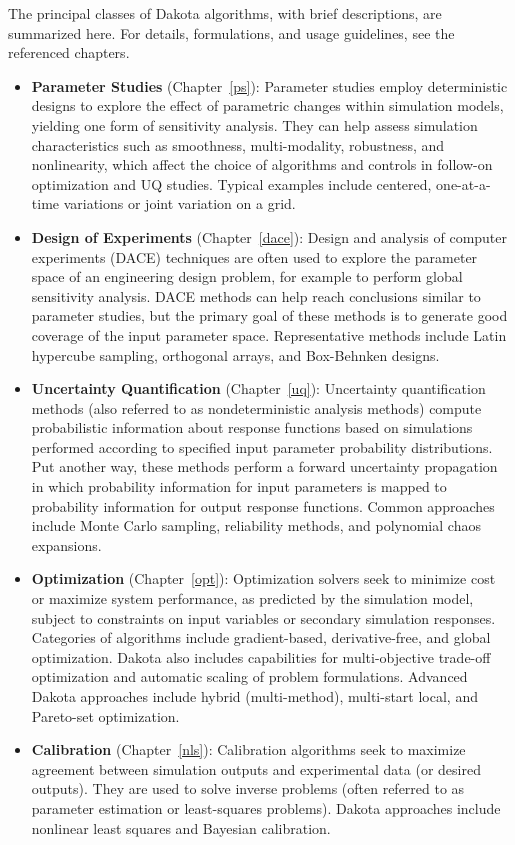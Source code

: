 The principal classes of Dakota algorithms, with brief descriptions,
are summarized here. For details, formulations, and usage guidelines,
see the referenced chapters.
\begin{itemize}
\item {\bf Parameter Studies} (Chapter~\ref{ps}): Parameter studies
  employ deterministic designs to explore the effect of parametric
  changes within simulation models, yielding one form of sensitivity
  analysis. They can help assess simulation characteristics such as
  smoothness, multi-modality, robustness, and nonlinearity, which
  affect the choice of algorithms and controls in follow-on
  optimization and UQ studies. Typical examples include centered,
  one-at-a-time variations or joint variation on a grid.

\item {\bf Design of Experiments} (Chapter~\ref{dace}): Design and
  analysis of computer experiments (DACE) techniques are often used to
  explore the parameter space of an engineering design problem, for
  example to perform global sensitivity analysis. DACE methods can
  help reach conclusions similar to parameter studies, but the primary
  goal of these methods is to generate good coverage of the input
  parameter space. Representative methods include Latin hypercube
  sampling, orthogonal arrays, and Box-Behnken designs.

\item {\bf Uncertainty Quantification} (Chapter~\ref{uq}): Uncertainty
  quantification methods (also referred to as nondeterministic
  analysis methods) compute probabilistic information about response
  functions based on simulations performed according to specified
  input parameter probability distributions. Put another way, these
  methods perform a forward uncertainty propagation in which
  probability information for input parameters is mapped to
  probability information for output response functions. Common
  approaches include Monte Carlo sampling, reliability methods, and
  polynomial chaos expansions.

\item {\bf Optimization} (Chapter~\ref{opt}): Optimization solvers
  seek to minimize cost or maximize system performance, as predicted
  by the simulation model, subject to constraints on input variables
  or secondary simulation responses. Categories of algorithms
  include gradient-based, derivative-free, and global optimization.
  Dakota also includes capabilities for multi-objective trade-off
  optimization and automatic scaling of problem formulations. Advanced
  Dakota approaches include hybrid (multi-method), multi-start local,
  and Pareto-set optimization.

\item {\bf Calibration} (Chapter~\ref{nls}): Calibration algorithms
  seek to maximize agreement between simulation outputs and
  experimental data (or desired outputs). They are used to solve inverse
  problems (often referred to as parameter estimation or least-squares
  problems). Dakota approaches include nonlinear least squares and
  Bayesian calibration.

\end{itemize}

